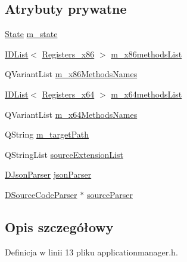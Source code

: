 \subsection*{Atrybuty prywatne}
\begin{DoxyCompactItemize}
\item 
\hyperlink{class_application_manager_aeb5af7a2aa47623af5160ea1f20d0243}{State} \hyperlink{class_application_manager_a371f65b49801926244ecc6283d05a965}{m\-\_\-state}
\item 
\hyperlink{class_application_manager_afc6759e44d61ba108cadcea101b30bc7}{I\-D\-List}$<$ \hyperlink{codedefines_8h_a0f84efe4ca4d99203713a78bd6e8c82e}{Registers\-\_\-x86} $>$ \hyperlink{class_application_manager_a95dbbdfce6b0865fad1dba671424bc81}{m\-\_\-x86methods\-List}
\item 
Q\-Variant\-List \hyperlink{class_application_manager_a4535135d50421609e8c984860b0f9af6}{m\-\_\-x86\-Methods\-Names}
\item 
\hyperlink{class_application_manager_afc6759e44d61ba108cadcea101b30bc7}{I\-D\-List}$<$ \hyperlink{codedefines_8h_a5e15b5c4d766f6faf29b5bcec37bde5c}{Registers\-\_\-x64} $>$ \hyperlink{class_application_manager_a36e1de12b3c278574f5a0f71cae72d37}{m\-\_\-x64methods\-List}
\item 
Q\-Variant\-List \hyperlink{class_application_manager_a77d122c9028919af104a0ac9992ecdc1}{m\-\_\-x64\-Methods\-Names}
\item 
Q\-String \hyperlink{class_application_manager_afef59bc227cf3e7c4b88e5328572afee}{m\-\_\-target\-Path}
\item 
Q\-String\-List \hyperlink{class_application_manager_a64d34ed2c01cd33346e372f4174fa7aa}{source\-Extension\-List}
\item 
\hyperlink{class_d_json_parser}{D\-Json\-Parser} \hyperlink{class_application_manager_a8c80655f96f9d827b8260ff73113934c}{json\-Parser}
\item 
\hyperlink{class_d_source_code_parser}{D\-Source\-Code\-Parser} $\ast$ \hyperlink{class_application_manager_af1e6bb5f28b480676de7b7f22d465baa}{source\-Parser}
\end{DoxyCompactItemize}


\subsection{Opis szczegółowy}


Definicja w linii 13 pliku applicationmanager.\-h.



